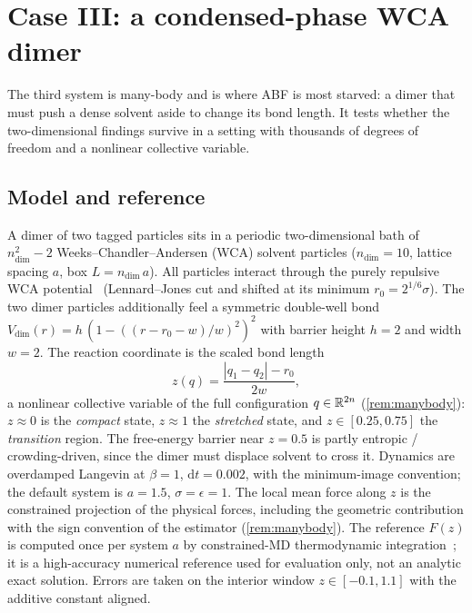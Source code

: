 \section{Case III: a condensed-phase WCA dimer}
\label{sec:case_wca}

The third system is many-body and is where ABF is most starved: a dimer that must
push a dense solvent aside to change its bond length. It tests whether the
two-dimensional findings survive in a setting with thousands of degrees of freedom
and a nonlinear collective variable.

\subsection{Model and reference}
A dimer of two tagged particles sits in a periodic two-dimensional bath of
$n_{\mathrm{dim}}^2-2$ Weeks--Chandler--Andersen (WCA) solvent particles
($n_{\mathrm{dim}}=10$, lattice spacing $a$, box $L=n_{\mathrm{dim}}\,a$). All
particles interact through the purely repulsive WCA
potential~\citep{WeeksChandlerAndersen1971} (Lennard--Jones cut and shifted at its
minimum $r_0=2^{1/6}\sigma$). The two dimer particles additionally feel a symmetric
double-well bond $V_{\mathrm{dim}}(r)=h\,(1-((r-r_0-w)/w)^2)^2$ with barrier
height $h=2$ and width $w=2$. The reaction coordinate is the scaled bond length
\begin{equation}
  z(q) = \frac{|q_1-q_2|-r_0}{2w},
  \label{eq:wca_cv}
\end{equation}
a nonlinear collective variable of the full configuration $q\in\mathbb{R}^{2n}$
(\cref{rem:manybody}): $z\approx0$ is the \emph{compact} state, $z\approx1$ the
\emph{stretched} state, and $z\in[0.25,0.75]$ the \emph{transition} region. The
free-energy barrier near $z=0.5$ is partly entropic / crowding-driven, since the
dimer must displace solvent to cross it. Dynamics are overdamped Langevin at
$\beta=1$, $\mathrm{d}t=0.002$, with the minimum-image convention; the default
system is $a=1.5$, $\sigma=\epsilon=1$. The local mean force along $z$ is the
constrained projection of the physical forces, including the geometric
contribution with the sign convention of the estimator (\cref{rem:manybody}). The
reference $F(z)$ is computed once per system $a$ by constrained-MD thermodynamic
integration~\citep{Carter1989,DenOtterBriels1998}; it is a high-accuracy numerical
reference used for evaluation only, not an analytic exact solution. Errors are
taken on the interior window
$z\in[-0.1,1.1]$ with the additive constant aligned.

